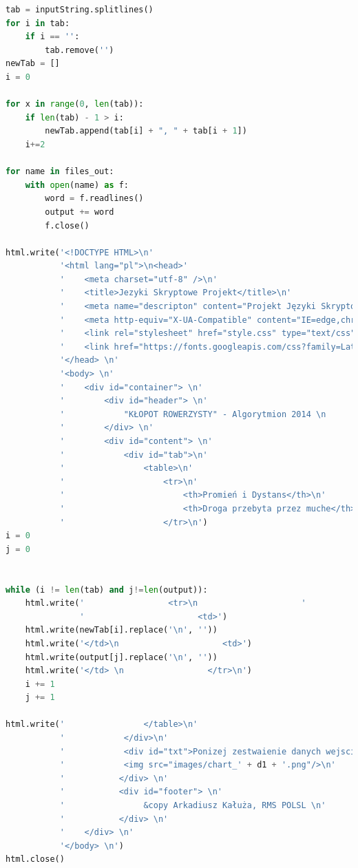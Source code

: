 \documentclass[12pt,a4paper]{article}
\begin{document}
\begin{itemize}
\begin{lstlisting}[language=Python]
tab = inputString.splitlines()
for i in tab:
    if i == '':
        tab.remove('')
newTab = []
i = 0

for x in range(0, len(tab)):
    if len(tab) - 1 > i:
        newTab.append(tab[i] + ", " + tab[i + 1])
    i+=2

for name in files_out:
    with open(name) as f:
        word = f.readlines()
        output += word
        f.close()

html.write('<!DOCTYPE HTML>\n'
           '<html lang="pl">\n<head>'
           '    <meta charset="utf-8" />\n'
           '    <title>Jezyki Skryptowe Projekt</title>\n'
           '    <meta name="descripton" content="Projekt Języki Skryptowe Arkadiusz Kałuża"/>\n'
           '    <meta http-equiv="X-UA-Compatible" content="IE=edge,chrome=1"/> \n'
           '    <link rel="stylesheet" href="style.css" type="text/css" /> \n'
           '    <link href="https://fonts.googleapis.com/css?family=Lato&display=swap" rel="stylesheet"> \n'
           '</head> \n'
           '<body> \n'
           '    <div id="container"> \n'
           '        <div id="header"> \n'
           '            "KŁOPOT ROWERZYSTY" - Algorytmion 2014 \n         '
           '        </div> \n'
           '        <div id="content"> \n'
           '            <div id="tab">\n'
           '                <table>\n'
           '                    <tr>\n'
           '                        <th>Promień i Dystans</th>\n'
           '                        <th>Droga przebyta przez muche</th>\n'
           '                    </tr>\n')
i = 0
j = 0


while (i != len(tab) and j!=len(output)):
    html.write('                 <tr>\n                     '
               '                       <td>')
    html.write(newTab[i].replace('\n', ''))
    html.write('</td>\n                     <td>')
    html.write(output[j].replace('\n', ''))
    html.write('</td> \n                 </tr>\n')
    i += 1
    j += 1

html.write('                </table>\n'
           '            </div>\n'
           '            <div id="txt">Ponizej zestwaienie danych wejsciowych i wyjsciowych </div> \n'
           '            <img src="images/chart_' + d1 + '.png"/>\n'
           '           </div> \n'
           '           <div id="footer"> \n'
           '                &copy Arkadiusz Kałuża, RMS POLSL \n'
           '           </div> \n'
           '    </div> \n'
           '</body> \n')
html.close()
	\end{lstlisting}
	

\end{itemize}
\end{document}
